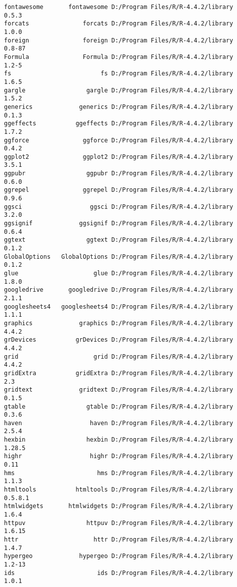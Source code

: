\documentclass[
  letterpaper,
  DIV=11,
  numbers=noendperiod]{scrreprt}
\begin{document}
\begin{verbatim}
fontawesome       fontawesome D:/Program Files/R/R-4.4.2/library      0.5.3
forcats               forcats D:/Program Files/R/R-4.4.2/library      1.0.0
foreign               foreign D:/Program Files/R/R-4.4.2/library     0.8-87
Formula               Formula D:/Program Files/R/R-4.4.2/library      1.2-5
fs                         fs D:/Program Files/R/R-4.4.2/library      1.6.5
gargle                 gargle D:/Program Files/R/R-4.4.2/library      1.5.2
generics             generics D:/Program Files/R/R-4.4.2/library      0.1.3
ggeffects           ggeffects D:/Program Files/R/R-4.4.2/library      1.7.2
ggforce               ggforce D:/Program Files/R/R-4.4.2/library      0.4.2
ggplot2               ggplot2 D:/Program Files/R/R-4.4.2/library      3.5.1
ggpubr                 ggpubr D:/Program Files/R/R-4.4.2/library      0.6.0
ggrepel               ggrepel D:/Program Files/R/R-4.4.2/library      0.9.6
ggsci                   ggsci D:/Program Files/R/R-4.4.2/library      3.2.0
ggsignif             ggsignif D:/Program Files/R/R-4.4.2/library      0.6.4
ggtext                 ggtext D:/Program Files/R/R-4.4.2/library      0.1.2
GlobalOptions   GlobalOptions D:/Program Files/R/R-4.4.2/library      0.1.2
glue                     glue D:/Program Files/R/R-4.4.2/library      1.8.0
googledrive       googledrive D:/Program Files/R/R-4.4.2/library      2.1.1
googlesheets4   googlesheets4 D:/Program Files/R/R-4.4.2/library      1.1.1
graphics             graphics D:/Program Files/R/R-4.4.2/library      4.4.2
grDevices           grDevices D:/Program Files/R/R-4.4.2/library      4.4.2
grid                     grid D:/Program Files/R/R-4.4.2/library      4.4.2
gridExtra           gridExtra D:/Program Files/R/R-4.4.2/library        2.3
gridtext             gridtext D:/Program Files/R/R-4.4.2/library      0.1.5
gtable                 gtable D:/Program Files/R/R-4.4.2/library      0.3.6
haven                   haven D:/Program Files/R/R-4.4.2/library      2.5.4
hexbin                 hexbin D:/Program Files/R/R-4.4.2/library     1.28.5
highr                   highr D:/Program Files/R/R-4.4.2/library       0.11
hms                       hms D:/Program Files/R/R-4.4.2/library      1.1.3
htmltools           htmltools D:/Program Files/R/R-4.4.2/library    0.5.8.1
htmlwidgets       htmlwidgets D:/Program Files/R/R-4.4.2/library      1.6.4
httpuv                 httpuv D:/Program Files/R/R-4.4.2/library     1.6.15
httr                     httr D:/Program Files/R/R-4.4.2/library      1.4.7
hypergeo             hypergeo D:/Program Files/R/R-4.4.2/library     1.2-13
ids                       ids D:/Program Files/R/R-4.4.2/library      1.0.1

\end{verbatim}
\end{document}
